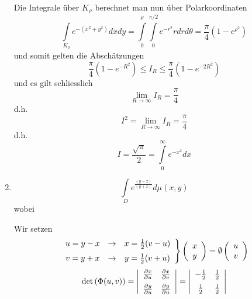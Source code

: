 \begin{enumerate}
Die Integrale über $K_\rho$ berechnet man nun über Polarkoordinaten
\[\int\limits_{{K_\rho }} {{e^{ - \left( {{x^2} + {y^2}} \right)}}dxdy}  = \int\limits_0^\rho  {\int\limits_0^{\pi /2} {{e^{ - {r^2}}}rdrd\theta } }  = \frac{\pi }{4}\left( {1 - {e^{{\rho ^2}}}} \right)\]
und somit gelten die Abschätzungen
\[\frac{\pi }{4}\left( {1 - {e^{ - {R^2}}}} \right) \le {I_R} \le \frac{\pi }{4}\left( {1 - {e^{ - 2{R^2}}}} \right)\]
und es gilt schliesslich
\[\mathop {\lim }\limits_{R \to \infty } {I_R} = \frac{\pi }{4}\]
d.h. \[{I^2} = \mathop {\lim }\limits_{R \to \infty } {I_R} = \frac{\pi }{4}\]
d.h. \[I = \frac{{\sqrt \pi  }}{2} = \int\limits_0^\infty  {{e^{ - {x^2}}}dx} \]
\item \[\int\limits_D e^{\frac{(y-x)}{(y+x)}}d\mu(x,y)\]
wobei 
\begin{center}
\end{center}
Wir setzen 
\[\left. {\begin{array}{*{20}{c}}
{u = y - x}& \to &{x = \frac{1}{2}(v - u)}\vspace{2mm}\\
{v = y + x}& \to &{y = \frac{1}{2}(v + u)}
\end{array}} \right\}\left( {\begin{array}{*{20}{c}}
x\\
y
\end{array}} \right) = \emptyset \left( {\begin{array}{*{20}{c}}
u\\
v
\end{array}} \right)\]
\[\det \left( {\Phi (u,v)} \right) = \left| {\begin{array}{*{20}{c}}
{\frac{{\partial x}}{{\partial u}}}&{\frac{{\partial x}}{{\partial v}}}\vspace{2mm}\\
{\frac{{\partial y}}{{\partial u}}}&{\frac{{\partial y}}{{\partial u}}}
\end{array}} \right| = \left| {\begin{array}{*{20}{c}}
{ - \frac{1}{2}}&{\frac{1}{2}}\vspace{2mm}\\
{\frac{1}{2}}&{\frac{1}{2}}
\end{array}} \right|\]


\end{enumerate}
